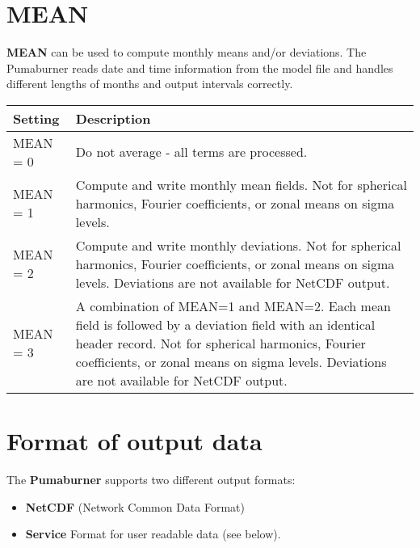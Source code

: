 \section{MEAN}

{\bf MEAN} can be used to compute monthly means and/or deviations.
The Pumaburner reads date and time information from the model file
and handles different lengths of months and output intervals correctly. 
\vspace{0.4cm}

\begin{tabular}{|l|p{12cm}|}
\hline
Setting & Description \\
\hline
        MEAN  =  0 & Do not average - all terms are processed. \\

        MEAN  =  1 & Compute and write monthly mean fields.
                     Not for spherical harmonics, Fourier coefficients, or
                     zonal means on sigma levels. \\

        MEAN  =  2 & Compute and write monthly deviations.
                     Not for spherical harmonics, Fourier coefficients, or
                     zonal means on sigma levels.
                     Deviations are not available for NetCDF output. \\

        MEAN  =  3 & A combination of MEAN=1 and MEAN=2.
                     Each mean field is followed by a deviation
                     field with an identical header record.
                     Not for spherical harmonics, Fourier coefficients, or
                     zonal means on sigma levels. 
		     Deviations are not available for NetCDF output. \\
\hline
\end{tabular}

\section{Format of output data}

The {\bf Pumaburner} supports two different output formats:

\begin{itemize}
\item {\bf NetCDF} (Network Common Data Format)
\item {\bf Service} Format for user readable data (see below).
\end{itemize}

